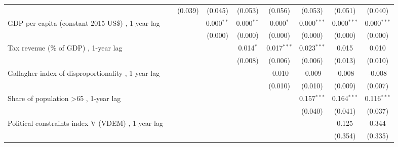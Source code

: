 \begin{table}[htbp]
\begin{tabular}{lcccccccc}
                                                                                         &                & (0.039)        & (0.045)        & (0.053)       & (0.056)       & (0.053)       & (0.051)       & (0.040)\\   
      GDP per capita (constant 2015 US\$) , 1-year lag                                   &                &                & 0.000$^{**}$   & 0.000$^{**}$  & 0.000$^{*}$   & 0.000$^{***}$ & 0.000$^{***}$ & 0.000$^{***}$\\   
                                                                                         &                &                & (0.000)        & (0.000)       & (0.000)       & (0.000)       & (0.000)       & (0.000)\\   
      Tax revenue (\% of GDP) , 1-year lag                                               &                &                &                & 0.014$^{*}$   & 0.017$^{***}$ & 0.023$^{***}$ & 0.015         & 0.010\\   
                                                                                         &                &                &                & (0.008)       & (0.006)       & (0.006)       & (0.013)       & (0.010)\\   
      Gallagher index of disproportionality , 1-year lag                                 &                &                &                &               & -0.010        & -0.009        & -0.008        & -0.008\\   
                                                                                         &                &                &                &               & (0.010)       & (0.010)       & (0.009)       & (0.007)\\   
      Share of population >65 , 1-year lag                                               &                &                &                &               &               & 0.157$^{***}$ & 0.164$^{***}$ & 0.116$^{***}$\\   
                                                                                         &                &                &                &               &               & (0.040)       & (0.041)       & (0.037)\\   
      Political constraints index V (VDEM) , 1-year lag                                  &                &                &                &               &               &               & 0.125         & 0.344\\   
                                                                                         &                &                &                &               &               &               & (0.354)       & (0.335)\\   

\end{tabular}
\end{table}
